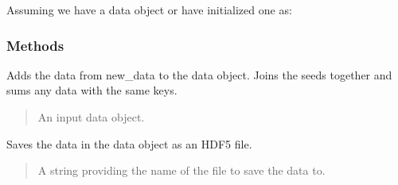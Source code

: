 \documentclass[letterpaper,10pt,english]{sphinxmanual}
\begin{document}
\sphinxAtStartPar
Assuming we have a data object or have initialized one as:

\begin{sphinxVerbatim}[commandchars=\\\{\}]
   
  
\end{sphinxVerbatim}


\subsubsection{Methods}
\label{\detokenize{user_guide/data_object:methods}}

\begin{fulllineitems}
\label{\detokenize{user_guide/data_object:data.add_data}}
\pysigstartsignatures
\pysiglinewithargsret
{}
{}
{}
\pysigstopsignatures
\sphinxAtStartPar
Adds the data from new\_data to the data object. Joins the seeds together and sums any
data with the same keys.
\begin{quote}\begin{description}
\sphinxAtStartPar
{} \textendash{} An input data object.

\end{description}\end{quote}

\end{fulllineitems}


\begin{fulllineitems}
\label{\detokenize{user_guide/data_object:data.save_as_h5}}
\pysigstartsignatures
\pysiglinewithargsret
{}
{}
{}
\pysigstopsignatures
\sphinxAtStartPar
Saves the data in the data object as an HDF5 file.
\begin{quote}\begin{description}
\sphinxAtStartPar
{} \textendash{} A string providing the name of the file to save the data to.

\end{description}\end{quote}

\end{fulllineitems}
\end{document}
